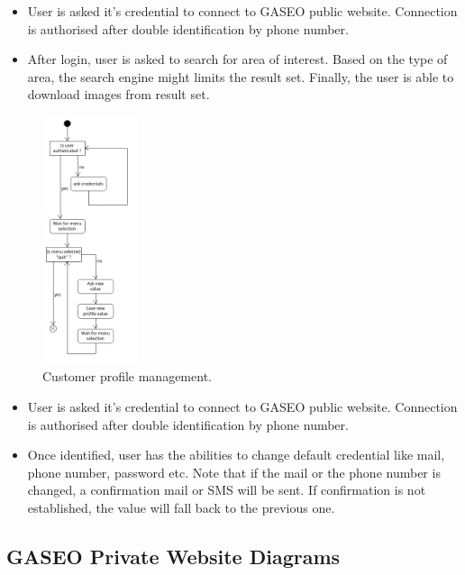 \documentclass[12pt]{article}
\begin{document}
\begin{itemize}
    \item User is asked it's credential to connect to GASEO public website. Connection is authorised after double identification by phone number.
    \item After login, user is asked to search for area of interest. Based on the type of area, the search engine might limits the result set. Finally, the user is able to download images from result set.
\end{itemize}

\newpage

\begin{figure}[h]
    \centering
    \includegraphics[width=0.25\textwidth]{Figures/Business Processes/Activity_3.png}
    \caption{ Customer profile management.}
\end{figure}

\begin{itemize}
    \item User is asked it's credential to connect to GASEO public website. Connection is authorised after double identification by phone number.
    \item Once identified, user has the abilities to change default credential like mail, phone number, password etc. Note that if the mail or the phone number is changed, a confirmation mail or SMS will be sent. If confirmation is not established, the value will fall back to the previous one.
\end{itemize}

\newpage
\subsection{GASEO Private Website Diagrams}
\end{document}
